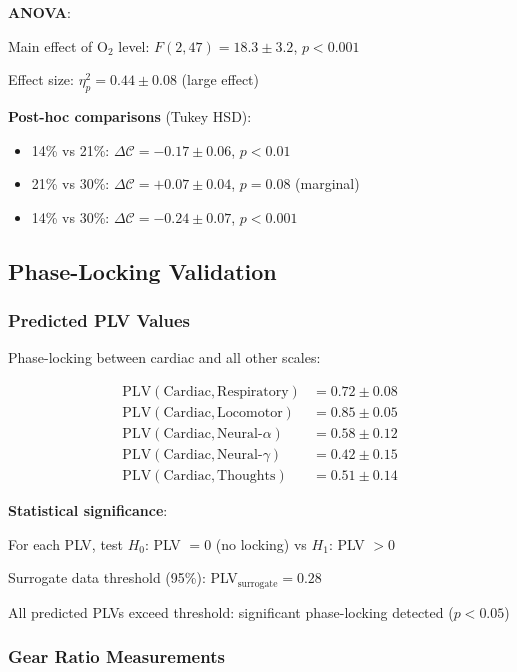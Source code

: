 \documentclass[11pt,onecolumn]{article}
\begin{document}
\textbf{ANOVA}:

Main effect of O$_2$ level: $F(2, 47) = 18.3 \pm 3.2$, $p < 0.001$

Effect size: $\eta_p^2 = 0.44 \pm 0.08$ (large effect)

\textbf{Post-hoc comparisons} (Tukey HSD):
\begin{itemize}
\item 14\% vs 21\%: $\Delta\mathcal{C} = -0.17 \pm 0.06$, $p < 0.01$
\item 21\% vs 30\%: $\Delta\mathcal{C} = +0.07 \pm 0.04$, $p = 0.08$ (marginal)
\item 14\% vs 30\%: $\Delta\mathcal{C} = -0.24 \pm 0.07$, $p < 0.001$
\end{itemize}

\subsection{Phase-Locking Validation}

\subsubsection{Predicted PLV Values}

Phase-locking between cardiac and all other scales:

\begin{align}
\text{PLV}(\text{Cardiac}, \text{Respiratory}) &= 0.72 \pm 0.08 \\
\text{PLV}(\text{Cardiac}, \text{Locomotor}) &= 0.85 \pm 0.05 \\
\text{PLV}(\text{Cardiac}, \text{Neural-}\alpha) &= 0.58 \pm 0.12 \\
\text{PLV}(\text{Cardiac}, \text{Neural-}\gamma) &= 0.42 \pm 0.15 \\
\text{PLV}(\text{Cardiac}, \text{Thoughts}) &= 0.51 \pm 0.14
\end{align}

\textbf{Statistical significance}:

For each PLV, test $H_0$: PLV $= 0$ (no locking) vs $H_1$: PLV $> 0$

Surrogate data threshold (95\%): PLV$_{\text{surrogate}} = 0.28$

All predicted PLVs exceed threshold: significant phase-locking detected ($p < 0.05$)

\subsubsection{Gear Ratio Measurements}
\end{document}
